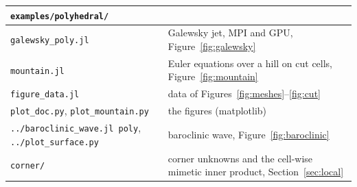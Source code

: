 \documentclass[11pt,a4paper]{article}
\newcommand{\code}[1]{\texttt{#1}}
\begin{document}
\begin{table}[h]
\centering\small
\begin{tabular}{ll}
\toprule
\code{examples/polyhedral/} & \\
\midrule
\code{galewsky\_poly.jl} & Galewsky jet, MPI and GPU, Figure~\ref{fig:galewsky} \\
\code{mountain.jl} & Euler equations over a hill on cut cells, Figure~\ref{fig:mountain} \\
\code{figure\_data.jl} & data of Figures~\ref{fig:meshes}--\ref{fig:cut} \\
\code{plot\_doc.py}, \code{plot\_mountain.py} & the figures (matplotlib) \\
\code{../baroclinic\_wave.jl poly}, \code{../plot\_surface.py} & baroclinic wave, Figure~\ref{fig:baroclinic} \\
\code{corner/} & corner unknowns and the cell-wise mimetic inner product, Section~\ref{sec:local} \\
\bottomrule
\end{tabular}
\end{table}
\end{document}
